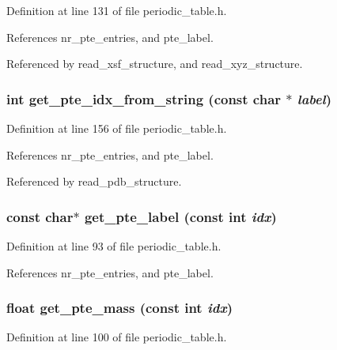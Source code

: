 Definition at line 131 of file periodic\_\-table.h.

References nr\_\-pte\_\-entries, and pte\_\-label.

Referenced by read\_\-xsf\_\-structure, and read\_\-xyz\_\-structure.
\subsubsection{\setlength{\rightskip}{0pt plus 5cm}int get\_\-pte\_\-idx\_\-from\_\-string (const char $\ast$ {\em label})\hspace{0.3cm}{\tt  [static]}}\label{periodic__table_8h_a8}




Definition at line 156 of file periodic\_\-table.h.

References nr\_\-pte\_\-entries, and pte\_\-label.

Referenced by read\_\-pdb\_\-structure.
\subsubsection{\setlength{\rightskip}{0pt plus 5cm}const char$\ast$ get\_\-pte\_\-label (const int {\em idx})\hspace{0.3cm}{\tt  [static]}}\label{periodic__table_8h_a4}




Definition at line 93 of file periodic\_\-table.h.

References nr\_\-pte\_\-entries, and pte\_\-label.
\subsubsection{\setlength{\rightskip}{0pt plus 5cm}float get\_\-pte\_\-mass (const int {\em idx})\hspace{0.3cm}{\tt  [static]}}\label{periodic__table_8h_a5}




Definition at line 100 of file periodic\_\-table.h.

